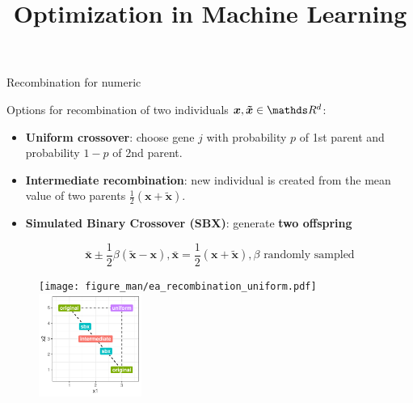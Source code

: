 \documentclass[11pt,compress,t,notes=noshow, xcolor=table]{beamer}
\title{Optimization in Machine Learning}
\date{}
\begin{document}
\sloppy

\begin{vbframe}{Recombination for numeric}

Options for recombination of two individuals $\bm{x}, \bm{\tilde x} \in \R^d$: 
\begin{itemize}
\item \textbf{Uniform crossover}: choose gene $j$ with probability $p$ of 1st parent and probability $1-p$ of 2nd parent.
\item \textbf{Intermediate recombination}: new individual is created from the mean value of two parents $\frac{1}{2}(\bm{x} + \bm{\tilde x})$.
\item \textbf{Simulated Binary Crossover (SBX)}: generate \textbf{two offspring}

$$
\bm{\bar x} \pm \frac{1}{2} \beta (\bm{\tilde x} - \bm{x}), \bm{\bar x} = \frac{1}{2} (\bm{x} + \bm{\tilde x}), \beta \text{ randomly sampled}
$$
\end{itemize}

\vspace*{-0.3cm}
\begin{figure}
  \texttt{[image: figure\_man/ea\_recombination\_uniform.pdf]}  
  \includegraphics[width=0.3\textwidth]{figure_man/ea_recombination_numeric.pdf}
\end{figure}

\end{vbframe}
\end{document}
